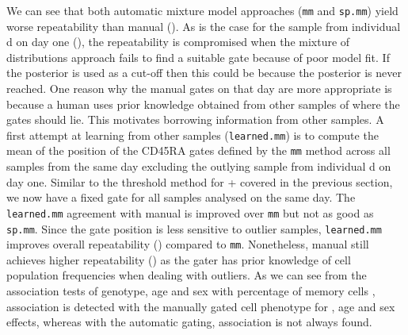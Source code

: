 We can see that both automatic mixture model approaches (\texttt{mm} and \texttt{sp.mm}) yield worse repeatability than manual ().
As is the case for the sample from individual d on day one (),
the repeatability is compromised when the mixture of distributions approach fails to find a suitable gate because of poor model fit.
If the posterior is used as a cut-off then this could be because the posterior is never reached.
One reason why the manual gates on that day are more appropriate is because a human uses prior knowledge obtained from other samples of where the gates should lie.
This motivates borrowing information from other samples.
A first attempt at learning from other samples (\texttt{learned.mm}) is to compute the mean of the position of the CD45RA gates defined by the \texttt{mm}
method across all samples from the same day excluding the outlying sample from individual d on day one.
Similar to the threshold method for + covered in the previous section, we now have a fixed gate for all samples analysed on the same day.
The \texttt{learned.mm} agreement with manual is improved over \texttt{mm} but not as good as \texttt{sp.mm}.
Since the gate position is less sensitive to outlier samples, \texttt{learned.mm} improves overall repeatability () compared to
\texttt{mm}.
Nonetheless, manual still achieves higher repeatability () as
the gater has prior knowledge of cell population frequencies when dealing with outliers.
As we can see from the association tests of genotype, age and sex with percentage of memory cells ,
association is detected with the manually gated cell phenotype for , age and sex effects,
whereas with the automatic gating, association is not always found.


